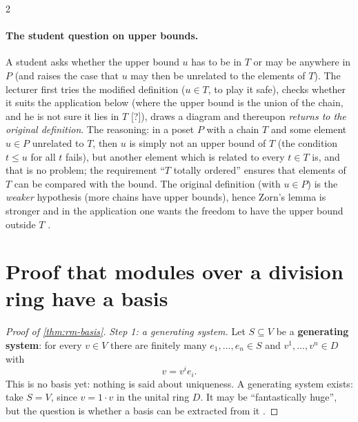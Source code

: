 \begin{paracol}{2}
\paragraph{The student question on upper bounds.} A student asks whether the upper bound $u$ has to be in $T$ or may be anywhere in $P$ (and raises the case that $u$ may then be unrelated to the elements of $T$). The lecturer first tries the modified definition ($u\in T$, to play it safe), checks whether it suits the application below (where the upper bound is the union of the chain, and he is not sure it lies in $T$ [?]), draws a diagram and thereupon \emph{returns to the original definition}. The reasoning: in a poset $P$ with a chain $T$ and some element $u\in P$ unrelated to $T$, then $u$ is simply not an upper bound of $T$ (the condition $t\le u$ for all $t$ fails), but
another element which is related to every $t\in T$ is, and that is no problem; the requirement ``$T$ totally ordered'' ensures that elements of $T$ can be compared with the bound. The original definition (with $u\in P$) is the \emph{weaker} hypothesis (more chains have upper bounds), hence Zorn's lemma is stronger and in the application one wants the freedom to
have the upper bound outside $T$               
           .

\section{Proof that modules over a division ring have a basis}\label{sec:rm-proof}

\begin{proof}[Proof of \cref{thm:rm-basis}]
\emph{Step 1: a generating system.} Let $S\subseteq V$ be a \textbf{generating system}: for every $v\in V$ there are finitely many $e_1,\dots,e_n\in S$ and $v^1,\dots,v^n\in D$ with
\[
  v=v^ie_i.
\]
This is no basis yet: nothing is said about uniqueness. A generating system exists: take $S=V$, since $v=1\cdot v$ in the unital ring $D$. It may be ``fantastically huge'', but the question is whether a basis can be extracted from it          .


\end{proof}
\end{paracol}
